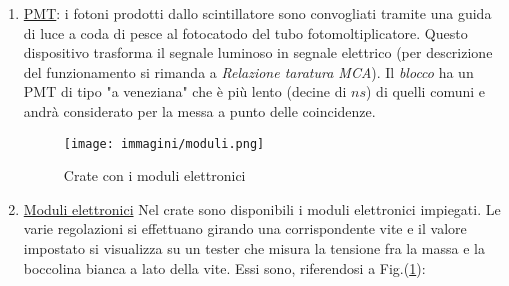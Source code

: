 \documentclass[12pt,a4paper,openright,twoside]{article}
\numberwithin{equation}{section} %
\begin{document}
\begin{enumerate}
Tuttavia il numero di $\mu$ fermati verrà misurato sperimentalmente e corrisponderà al numero di START definito nel Par.(\ref{circpertau}).\footnote{nel Par.(\ref{circpertau}) verrà chiarito come al segnale elettronico di START non corrisponderà sempre l'evento di $\mu$ fermato}

L'energia ceduta è quindi trasformata in fotoni del range visibile a cui il materiale stesso è trasparente e potranno quindi giungere tramite riflessioni interne e la guida di luce al PMT.
Si assume inoltre che il segnale luminoso prodotto sia in proporzionalità diretta con l'energia rilasciata, ipotesi sicuramente attendibile negli stretti range di energia che saranno considerati nel presente esperimento.
Il segnale generato segue la tipica forma esponenziale con tempi caratteristici molto rapidi (qualche $ns$). A differenza degli scintillatori inorganici, il tempo di salita sarà confrontabile con quello di discesa, facendo assomigliare il segnale a una gaussiana.


\item \underline{PMT}: i fotoni prodotti dallo scintillatore sono convogliati tramite una guida di luce a coda di pesce al fotocatodo del tubo fotomoltiplicatore. Questo dispositivo trasforma il segnale luminoso in segnale elettrico (per descrizione del funzionamento si rimanda a \textit{Relazione taratura MCA}). Il \textit{blocco} ha un PMT di tipo "a veneziana" che è più lento (decine di $ns$) di quelli comuni e andrà considerato per la messa a punto delle coincidenze.

\begin{figure}[hbtp]
\centering
\texttt{[image: immagini/moduli.png]}
\caption{Crate con i moduli elettronici}
\label{crate}
\end{figure}

\item \underline{Moduli elettronici} \label{moduli} Nel crate sono disponibili i moduli elettronici impiegati. Le varie regolazioni si effettuano girando una corrispondente vite e il valore impostato si visualizza su un tester che misura la tensione fra la massa e la boccolina bianca a lato della vite. Essi sono, riferendosi a Fig.(\ref{crate}):


\end{enumerate}
\end{document}
